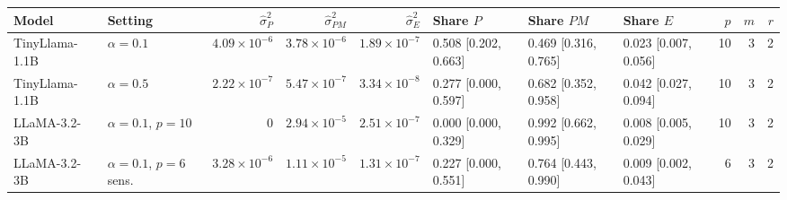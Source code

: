 \begin{tabular}{llrrrlllrrr}
\toprule
Model & Setting & $\hat\sigma^2_P$ & $\hat\sigma^2_{PM}$ & $\hat\sigma^2_E$ & Share $P$ & Share $PM$ & Share $E$ & $p$ & $m$ & $r$ \\
\midrule
TinyLlama-1.1B & $\alpha{=}0.1$ & $4.09{\times}10^{-6}$ & $3.78{\times}10^{-6}$ & $1.89{\times}10^{-7}$ & 0.508 [0.202, 0.663] & 0.469 [0.316, 0.765] & 0.023 [0.007, 0.056] & 10 & 3 & 2 \\
TinyLlama-1.1B & $\alpha{=}0.5$ & $2.22{\times}10^{-7}$ & $5.47{\times}10^{-7}$ & $3.34{\times}10^{-8}$ & 0.277 [0.000, 0.597] & 0.682 [0.352, 0.958] & 0.042 [0.027, 0.094] & 10 & 3 & 2 \\
LLaMA-3.2-3B & $\alpha{=}0.1$, $p{=}10$ & 0 & $2.94{\times}10^{-5}$ & $2.51{\times}10^{-7}$ & 0.000 [0.000, 0.329] & 0.992 [0.662, 0.995] & 0.008 [0.005, 0.029] & 10 & 3 & 2 \\
LLaMA-3.2-3B & $\alpha{=}0.1$, $p{=}6$ sens.\  & $3.28{\times}10^{-6}$ & $1.11{\times}10^{-5}$ & $1.31{\times}10^{-7}$ & 0.227 [0.000, 0.551] & 0.764 [0.443, 0.990] & 0.009 [0.002, 0.043] & 6 & 3 & 2 \\
\bottomrule
\end{tabular}

